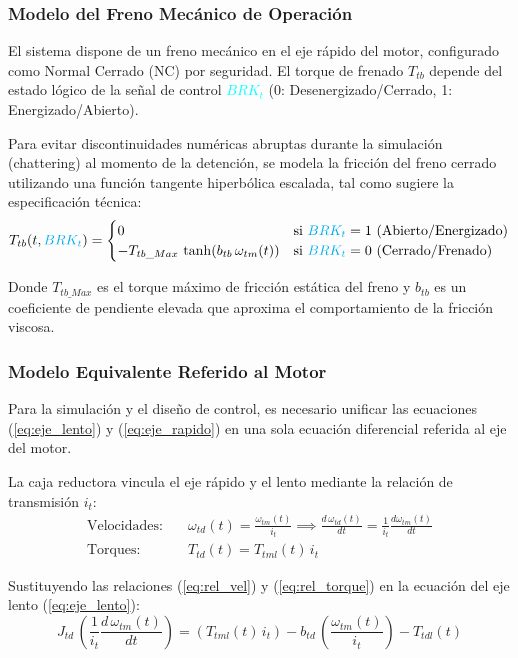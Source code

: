 \documentclass[11pt]{article}                                    %
\begin{document}
\subsubsection*{Modelo del Freno Mecánico de Operación}
El sistema dispone de un freno mecánico en el eje rápido del motor, configurado como Normal Cerrado (NC) por seguridad. El torque de frenado $T_{tb}$ depende del estado lógico de la señal de control \textcolor{cyan}{$BRK_t$} (0: Desenergizado/Cerrado, 1: Energizado/Abierto).

Para evitar discontinuidades numéricas abruptas durante la simulación (chattering) al momento de la detención, se modela la fricción del freno cerrado utilizando una función tangente hiperbólica escalada, tal como sugiere la especificación técnica:
\begin{equation} \label{eq:brake_model}
    T_{tb}(t,\textcolor{cyan}{BRK_t}) = 
    \begin{cases} 
        0 & \text{si } \textcolor{cyan}{BRK_t} = 1 \text{ (Abierto/Energizado)} \\
        -T_{tb\_Max} \, \tanh(b_{tb} \, \omega_{tm}(t)) & \text{si } \textcolor{cyan}{BRK_t} = 0 \text{ (Cerrado/Frenado)}
    \end{cases}
\end{equation}

Donde $T_{tb\_Max}$ es el torque máximo de fricción estática del freno y $b_{tb}$ es un coeficiente de pendiente elevada que aproxima el comportamiento de la fricción viscosa.

\subsubsection*{Modelo Equivalente Referido al Motor}
Para la simulación y el diseño de control, es necesario unificar las ecuaciones (\ref{eq:eje_lento}) y (\ref{eq:eje_rapido}) en una sola ecuación diferencial referida al eje del motor.

La caja reductora vincula el eje rápido y el lento mediante la relación de transmisión $i_t$:
\begin{align}
    \text{Velocidades:} & \quad \omega_{td}(t) = \frac{\omega_{tm}(t)}{i_t} \implies \frac{d \, \omega_{td}(t)}{dt} = \frac{1}{i_t}\frac{d\omega_{tm}(t)}{dt} \label{eq:rel_vel} \\
    \text{Torques:} & \quad T_{td}(t) = T_{tml}(t) \, i_t \label{eq:rel_torque}
\end{align}

Sustituyendo las relaciones (\ref{eq:rel_vel}) y (\ref{eq:rel_torque}) en la ecuación del eje lento (\ref{eq:eje_lento}):
\begin{equation*}
    J_{td} \, \left( \frac{1}{i_t} \frac{d \, \omega_{tm}(t)}{dt} \right) = (T_{tml}(t) \, i_t) - b_{td} \, \left( \frac{\omega_{tm}(t)}{i_t} \right) - T_{tdl}(t)
\end{equation*}
\end{document}
